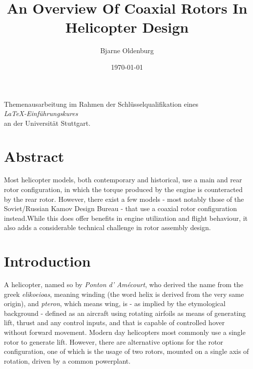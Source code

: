 \documentclass[11pt, a4paper]{scrartcl}
\title{An Overview Of Coaxial Rotors In Helicopter Design}
\author{Bjarne Oldenburg}
\date{\today}
\begin{document}
\maketitle

\begin{center}
    Themenausarbeitung im Rahmen der Schlüsselqualifikation eines\\ \emph{\LaTeX-Einführungskures}\\ an der Universität Stuttgart.
    \vspace{1cm}\\
\end{center}

\section{Abstract\label{Abstract}}
Most helicopter models, both contemporary and historical, use a main and rear rotor configuration, in which the torque produced by the engine is counteracted
by the rear rotor. However, there exist a few models - most notably those of the Soviet/Russian Kamov Design Bureau - that use a coaxial rotor configuration instead.While this does offer benefits in engine utilization and flight behaviour, it also adds a considerable technical challenge in rotor assembly design.

\section{Introduction\label{Introduction}}
A helicopter, named so by \emph{Ponton d' Amécourt}, who derived the name from the greek \emph{elikoeioas}, meaning winding (the word helix is derived from the very same origin), and \emph{pteron}, which means wing, is - as implied by the etymological background - defined as an aircraft using rotating airfoils as means of generating lift, thrust and any control inputs, and that is capable of controlled hover without forward movement.\cite{leishman-2000} Modern day helicopters most commonly use a single rotor to generate lift. However, there are alternative options for the rotor configuration, one of which is the usage of two rotors, mounted on a single axis of rotation, driven by a common powerplant.
\end{document}
